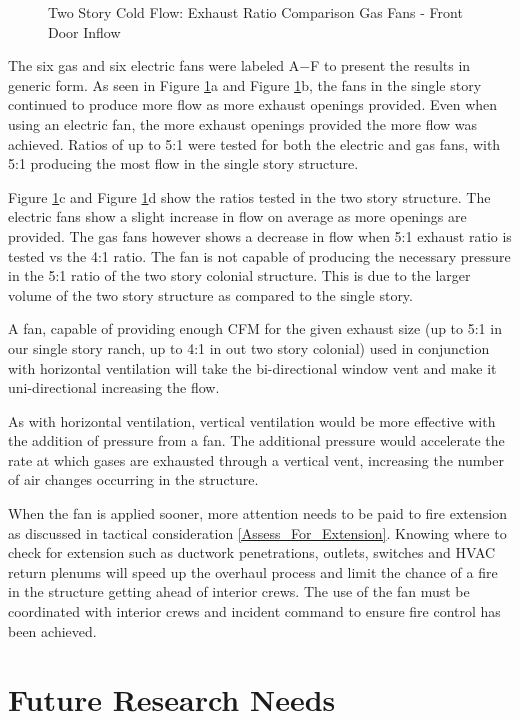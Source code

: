 \documentclass{article}
\begin{document}
\begin{figure}[H]
\begin{tabular}{*2c}
	\end{tabular}
	\caption{Two Story Cold Flow: Exhaust Ratio Comparison Gas Fans - Front Door Inflow}
	\label{fig:MoreFlowTC}
\end{figure}

The six gas and six electric fans were labeled A$-$F to present the results in generic form. As seen in Figure \ref{fig:MoreFlowTC}a and Figure \ref{fig:MoreFlowTC}b, the fans in the single story continued to produce more flow as more exhaust openings provided. Even when using an electric fan, the more exhaust openings provided the more flow was achieved. Ratios of up to 5:1 were tested for both the electric and gas fans, with 5:1 producing the most flow in the single story structure. 

Figure \ref{fig:MoreFlowTC}c and Figure \ref{fig:MoreFlowTC}d show the ratios tested in the two story structure. The electric fans show a slight increase in flow on average as more openings are provided. The gas fans however shows a decrease in flow when 5:1 exhaust ratio is tested vs the 4:1 ratio. The fan is not capable of producing the necessary pressure in the 5:1 ratio of the two story colonial structure. This is due to the larger volume of the two story structure as compared to the single story.

A fan, capable of providing enough CFM for the given exhaust size (up to 5:1 in our single story ranch, up to 4:1 in out two story colonial) used in conjunction with horizontal ventilation will take the bi-directional window vent and make it uni-directional increasing the flow.

As with horizontal ventilation, vertical ventilation would be more effective with the addition of pressure from a fan. The additional pressure would accelerate the rate at which gases are exhausted through a vertical vent, increasing the number of air changes occurring in the structure.

When the fan is applied sooner, more attention needs to be paid to fire extension as discussed in tactical consideration \ref{Assess_For_Extension}. Knowing where to check for extension such as ductwork penetrations, outlets, switches and HVAC return plenums will speed up the overhaul process and limit the chance of a fire in the structure getting ahead of interior crews.  The use of the fan must be coordinated with interior crews and incident command to ensure fire control has been achieved.  

\section{Future Research Needs}
\end{document}
